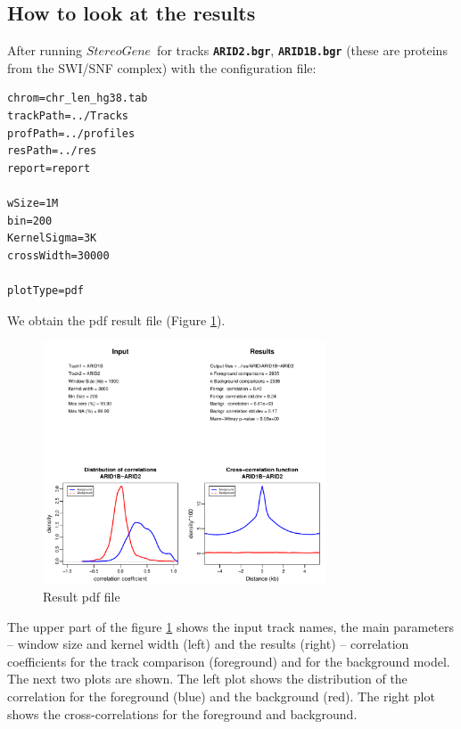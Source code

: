 \documentclass{article}
\newcommand{\tw}{\textwidth}
\newcommand{\prm}[1]{\texttt{\textbf{{#1}}}}
\newcommand{\sg}{$StereoGene$\ }
\begin{document}
\subsection{How to look at the results}
After running \sg for tracks \prm{ARID2.bgr}, \prm{ARID1B.bgr} (these are proteins from the SWI/SNF complex) with the configuration file:
\begin{shaded} 
\begin{footnotesize}
\begin{verbatim}
chrom=chr_len_hg38.tab
trackPath=../Tracks
profPath=../profiles
resPath=../res
report=report

wSize=1M
bin=200
KernelSigma=3K
crossWidth=30000

plotType=pdf
\end{verbatim}
\end{footnotesize}
\end{shaded}
We obtain the pdf result file (Figure \ref{res1}).
\begin{center}
\begin{figure}[!h]
\includegraphics[width=0.75\tw]{fig/ARID1B~ARID2.pdf}
\caption{Result pdf file}\label{res1}
\end{figure}
\end{center}


The upper part of the figure \ref{res1} shows the input track names, the main parameters -- window size and kernel width (left) and the results (right) -- correlation coefficients for the track comparison (foreground) and for the background model. 
The next two plots are shown. The left plot shows the distribution of the correlation for the foreground (blue) and the background (red). The right plot shows the cross-correlations for the foreground and background.
\end{document}

